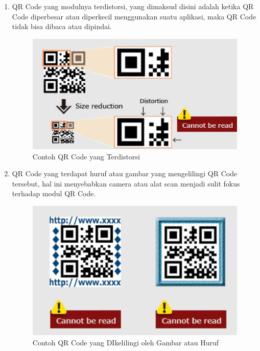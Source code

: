 \begin{enumerate}
	\item QR Code yang modulnya terdistorsi, yang dimaksud disini adalah ketika QR Code diperbesar atau diperkecil menggunakan suatu aplikasi, maka QR Code tidak bisa dibaca atau dipindai.
	\begin{figure}[H]
		\centering
		\includegraphics[scale=1]{Gambar/qrDistro.png}
		\caption{Contoh QR Code yang Terdistorsi} 
		\label{fig:qrDistro}
	\end{figure}
	
	\item QR Code yang terdapat huruf atau gambar yang mengelilingi QR Code tersebut, hal ini menyebabkan camera atau alat scan menjadi sulit fokus terhadap modul QR Code.
	\begin{figure}[H]
		\centering
		\includegraphics[scale=1]{Gambar/qrGambar.png}
		\caption{Contoh QR Code yang DIkelilingi oleh Gambar atau Huruf} 
		\label{fig:qrGambar}
	\end{figure}
	

\end{enumerate}
